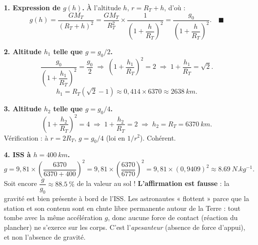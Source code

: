 \documentclass[11pt]{article}
\newcommand{\cle}[1]{{\popxbold\color{popdark}#1}}
\begin{document}
\begin{corrige}
\textbf{1. Expression de $g(h)$.} À l'altitude $h$, $r = R_T + h$, d'où :
\[
g(h) = \frac{G M_T}{(R_T+h)^2} = \frac{G M_T}{R_T^2}\times\frac{1}{\left(1+\dfrac{h}{R_T}\right)^2} = \frac{g_0}{\left(1+\dfrac{h}{R_T}\right)^2}. \quad \blacksquare
\]

\textbf{2. Altitude $h_1$ telle que $g = g_0/2$.}
\[
\frac{g_0}{\left(1+\dfrac{h_1}{R_T}\right)^2} = \frac{g_0}{2}
\;\Longrightarrow\; \left(1+\frac{h_1}{R_T}\right)^2 = 2
\;\Longrightarrow\; 1+\frac{h_1}{R_T} = \sqrt{2}.
\]
\[
\boxed{h_1 = R_T\left(\sqrt{2}-1\right)} \approx 0,414 \times 6370 \approx \SI{2638}{km}.
\]

\textbf{3. Altitude $h_2$ telle que $g = g_0/4$.}
\[
\left(1+\frac{h_2}{R_T}\right)^2 = 4 \;\Longrightarrow\; 1+\frac{h_2}{R_T} = 2 \;\Longrightarrow\; \boxed{h_2 = R_T = \SI{6370}{km}}.
\]
Vérification : à $r = 2R_T$, $g = g_0/4$ (loi en $1/r^2$). Cohérent.

\textbf{4. ISS à $h = \SI{400}{km}$.}
\[
g = 9,81\times\left(\frac{6370}{6370+400}\right)^2 = 9,81\times\left(\frac{6370}{6770}\right)^2 = 9,81\times(0,9409)^2 \approx \SI{8,69}{N.kg^{-1}}.
\]
Soit encore $\dfrac{g}{g_0} \approx \SI{88,5}{\%}$ de la valeur au sol ! \textbf{L'affirmation est fausse} : la gravité est bien présente à bord de l'ISS. Les astronautes « flottent » parce que la station et son contenu sont en \cle{chute libre} permanente autour de la Terre : tout tombe avec la même accélération $g$, donc aucune force de contact (réaction du plancher) ne s'exerce sur les corps. C'est l'\emph{apesanteur} (absence de force d'appui), et non l'absence de gravité.
\end{corrige}
\end{document}
